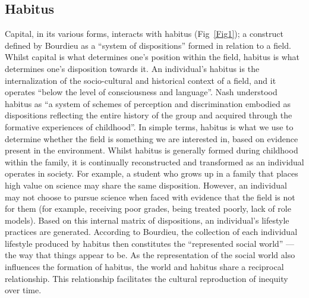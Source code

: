\subsection{Habitus}
Capital, in its various forms, interacts with habitus (Fig~\ref{Fig1}); a construct defined by Bourdieu as a ``system of dispositions''\cite{Bourdieu1984} formed in relation to a field. Whilst capital is what determines one's position within the field, habitus is what determines one's disposition towards it.\cite{Bourdieu1992} An individual's habitus is the internalization of the socio-cultural and historical context of a field, and it operates ``below the level of consciousness and language''.\cite{Bourdieu1984} Nash\cite{Nash1999} understood habitus as ``a system of schemes of perception and discrimination embodied as dispositions reflecting the entire history of the group and acquired through the formative experiences of childhood''. In simple terms, habitus is what we use to determine whether the field is something we are interested in, based on evidence present in the environment. Whilst habitus is generally formed during childhood within the family\cite{Dimaggio1982}, it is continually reconstructed and transformed as an individual operates in society. For example, a student who grows up in a family that places high value on science may share the same disposition.\cite{archer2013aspires} However, an individual may not choose to pursue science when faced with evidence that the field is not for them (for example, receiving poor grades, being treated poorly, lack of role models). Based on this internal matrix of dispositions, an individual's lifestyle practices are generated. According to Bourdieu, the collection of each individual lifestyle produced by habitus then constitutes the ``represented social world''\cite{Bourdieu1984} --- the way that things appear to be. As the representation of the social world also influences the formation of habitus, the world and habitus share a reciprocal relationship. This relationship facilitates the cultural reproduction of inequity over time. 

